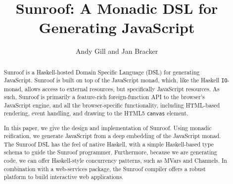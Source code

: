 \documentclass{llncs}
\newcommand{\Src}[1]{{\tt{#1}}}
\newcommand{\IO}{\Src{IO}}
\begin{document}
%
\title{Sunroof: A Monadic DSL for Generating JavaScript}
%
%
\author{Andy Gill and Jan Bracker}
%
%
%

\maketitle

\begin{abstract}        
Sunroof is a Haskell-hosted Domain Specific Language (DSL) for generating JavaScript.
Sunroof is built on top of the JavaScript monad, which, like the Haskell \IO-monad, allows 
access to external resources, but specifically JavaScript
resources. As such, Sunroof is primarily a feature-rich 
foreign-function API to the browser's JavaScript engine, and all the browser-specific
functionality, including HTML-based rendering, event handling, and 
drawing to the HTML5 {\tt canvas} element. 

In this paper, we give the design and implementation of Sunroof.
Using monadic reification, we generate JavaScript from
a deep embedding of the JavaScript monad.
The Sunroof DSL has the feel of native Haskell, with a simple
Haskell-based type schema to guide the Sunroof programmer.
Furthermore, because we are generating code,
we can offer Haskell-style concurrency patterns, such as MVars and Channels.
In combination with a web-services package,
the Sunroof compiler offers a robust platform to build interactive web applications.

\end{abstract}
%
\end{document}
